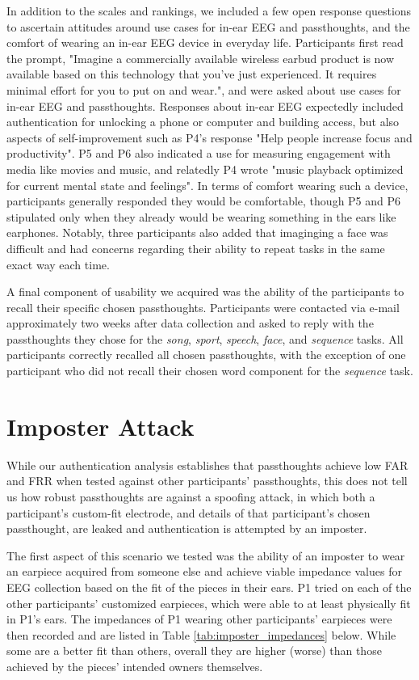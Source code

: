 \documentclass{sigchi}
\begin{document}
In addition to the scales and rankings, we included a few open response questions to ascertain attitudes around use cases for in-ear EEG and passthoughts, and the comfort of wearing an in-ear EEG device in everyday life. Participants first read the prompt, "Imagine a commercially available wireless earbud product is now available based on this technology that you've just experienced. It requires minimal effort for you to put on and wear.", and were asked about use cases for in-ear EEG and passthoughts. Responses about in-ear EEG expectedly included authentication for unlocking a phone or computer and building access, but also aspects of self-improvement such as P4's response "Help people increase focus and productivity". P5 and P6 also indicated a use for measuring engagement with media like movies and music, and relatedly P4 wrote "music playback optimized for current mental state and feelings". In terms of comfort wearing such a device, participants generally responded they would be comfortable, though P5 and P6 stipulated only when they already would be wearing something in the ears like earphones. Notably, three participants also added that imaginging a face was difficult and had concerns regarding their ability to repeat tasks in the same exact way each time.

A final component of usability we acquired was the ability of the participants to recall their specific chosen passthoughts. Participants were contacted via e-mail approximately two weeks after data collection and asked to reply with the passthoughts they chose for the \textit{song}, \textit{sport}, \textit{speech}, \textit{face}, and \textit{sequence} tasks. All participants correctly recalled all chosen passthoughts, with the exception of one participant who did not recall their chosen word component for the \textit{sequence} task. 

\section{Imposter Attack}

While our authentication analysis establishes that passthoughts achieve low FAR and FRR when tested against other participants' passthoughts, this does not tell us how robust passthoughts are against a spoofing attack, in which both a participant's custom-fit electrode, and details of that participant's chosen passthought, are leaked and authentication is attempted by an imposter. 

The first aspect of this scenario we tested was the ability of an imposter to wear an earpiece acquired from someone else and achieve viable impedance values for EEG collection based on the fit of the pieces in their ears. P1 tried on each of the other participants' customized earpieces, which were able to at least physically fit in P1's ears. The impedances of P1 wearing other participants' earpieces were then recorded and are listed in Table \ref{tab:imposter_impedances} below. While some are a better fit than others, overall they are higher (worse) than those achieved by the pieces' intended owners themselves.
\end{document}
